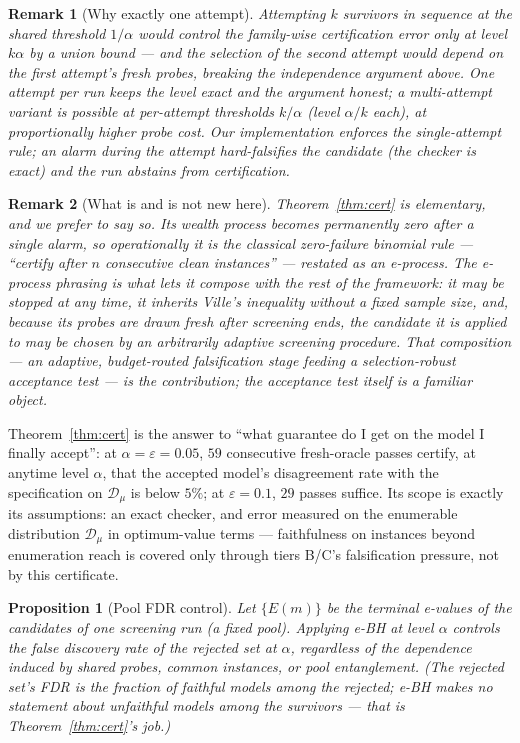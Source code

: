 \documentclass[pdflatex,sn-mathphys-num]{sn-jnl}
\theoremstyle{thmstyleone}
\newtheorem{proposition}[theorem]{Proposition}
\theoremstyle{thmstyletwo}
\newtheorem{remark}{Remark}
\newcommand{\Eproc}{E}
\begin{document}
\begin{remark}[Why exactly one attempt]\label{rem:oneattempt}
Attempting $k$ survivors in sequence at the shared threshold
$1/\alpha$ would control the family-wise certification error only at
level $k\alpha$ by a union bound --- and the selection of the second
attempt would depend on the first attempt's fresh probes, breaking
the independence argument above. One attempt per run keeps the level
exact and the argument honest; a multi-attempt variant is possible at
per-attempt thresholds $k/\alpha$ (level $\alpha/k$ each), at
proportionally higher probe cost. Our implementation enforces the
single-attempt rule; an alarm during the attempt hard-falsifies the
candidate (the checker is exact) and the run abstains from
certification.
\end{remark}

\begin{remark}[What is and is not new here]\label{rem:novelty}
Theorem~\ref{thm:cert} is elementary, and we prefer to say so. Its
wealth process becomes permanently zero after a single alarm, so
operationally it \emph{is} the classical zero-failure binomial rule
--- ``certify after $n$ consecutive clean instances'' --- restated as
an e-process. The e-process phrasing is what lets it compose with the
rest of the framework: it may be stopped at any time, it inherits
Ville's inequality without a fixed sample size, and, because its
probes are drawn fresh after screening ends, the candidate it is
applied to may be chosen by an arbitrarily adaptive screening
procedure. That composition --- an adaptive, budget-routed
falsification stage feeding a selection-robust acceptance test --- is
the contribution; the acceptance test itself is a familiar object.
\end{remark}

Theorem~\ref{thm:cert} is the answer to ``what guarantee do I get on
the model I finally accept'': at $\alpha = \varepsilon = 0.05$,
$59$ consecutive fresh-oracle passes certify, at anytime level
$\alpha$, that the accepted model's disagreement rate with the
specification on $\mathcal{D}_{\mu}$ is below $5\%$; at
$\varepsilon = 0.1$, $29$ passes suffice. Its scope is exactly its
assumptions: an exact checker, and error measured on the enumerable
distribution $\mathcal{D}_{\mu}$ in optimum-value terms ---
faithfulness on instances beyond enumeration reach is covered only
through tiers B/C's falsification pressure, not by this certificate.

\begin{proposition}[Pool FDR control]\label{prop:ebh}
Let $\{ \Eproc(m) \}$ be the terminal e-values of the candidates of
one screening run (a fixed pool). Applying e-BH at level $\alpha$
controls the false discovery rate of the rejected set at $\alpha$,
regardless of the dependence induced by shared probes, common
instances, or pool entanglement. (The rejected set's FDR is the
fraction of \emph{faithful} models among the rejected; e-BH makes no
statement about unfaithful models among the survivors --- that is
Theorem~\ref{thm:cert}'s job.)
\end{proposition}
\end{document}
